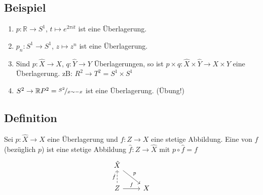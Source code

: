 \subsection[Beispiele für Überlagerungen]{Beispiel} %
\label{sub:106}
\begin{enumerate}[(1)]
	\item $p : \mathds{R} \to S^1$, $t \mapsto e^{2 \pi  i t}$ ist eine Überlagerung.
	\item $p_n : S^1 \to S^1$, $z \mapsto z^n$ ist eine Überlagerung.
	\item Sind $p : \hat{X} \to X$, $q : \hat{Y} \to Y$ Überlagerungen, so ist $p \times q : \hat{X} \times \hat{Y} \to X \times Y$ eine Überlagerung.
	zB: $R^2 \to T^2 = S^1 \times S^1$
	\item $S^2 \to \mathds{R}P^2= \nicefrac{S^2}{x \sim -x}$ ist eine Überlagerung. \hfill (Übung!)
\end{enumerate}

\subsection[Definition: Hebung]{Definition} %
\label{sub:107}
Sei $p : \hat{X} \to X$ eine Überlagerung und $f : Z \to X$ eine stetige Abbildung. Eine  von $f$ (bezüglich $p$) ist eine stetige Abbildung 
$\hat{f} : Z \to \hat{X}$ mit $p \circ  \hat{f} = f$
\[
	\begin{tikzcd}
		\hat{X} \drar{p}&  \\
		Z \rar{f} \uar[dashed]{\hat{f}}& X
	\end{tikzcd}
\]

